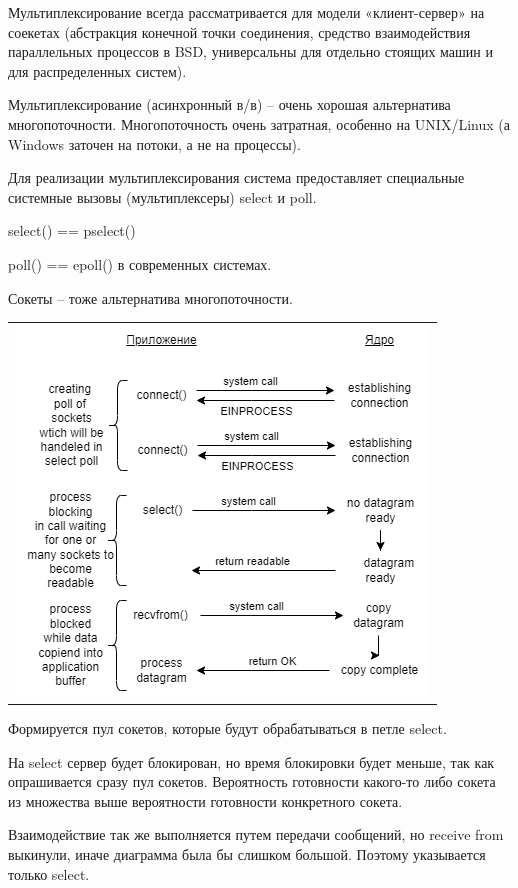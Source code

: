 Мультиплексирование всегда рассматривается для модели «клиент-сервер» на соекетах (абстракция конечной точки соединения, средство взаимодействия параллельных процессов в BSD, универсальны для отдельно стоящих машин и для распределенных систем).                                                 

Мультиплексирование (асинхронный в/в) – очень хорошая альтернатива многопоточности. Многопоточность очень затратная, особенно на UNIX/Linux (а Windows заточен на потоки, а не на процессы).

Для реализации мультиплексирования система предоставляет специальные системные вызовы (мультиплексеры) select и poll.

select() == pselect()

poll() == epoll() в современных системах.

Сокеты – тоже альтернатива многопоточности.

\begin{table}[H]
  \centering
  \begin{tabular}{p{1\linewidth}}
    \centering
    \includegraphics[width=0.8\linewidth]{./images/1-3.png}
  \end{tabular}
\end{table}
Формируется пул сокетов, которые будут обрабатываться в петле select.

На select сервер будет блокирован, но время блокировки будет меньше, так как опрашивается сразу пул сокетов. Вероятность готовности какого-то либо сокета из множества выше вероятности готовности конкретного сокета.

Взаимодействие так же выполняется путем передачи сообщений, но receive from выкинули, иначе диаграмма была бы слишком большой. Поэтому указывается только select.


